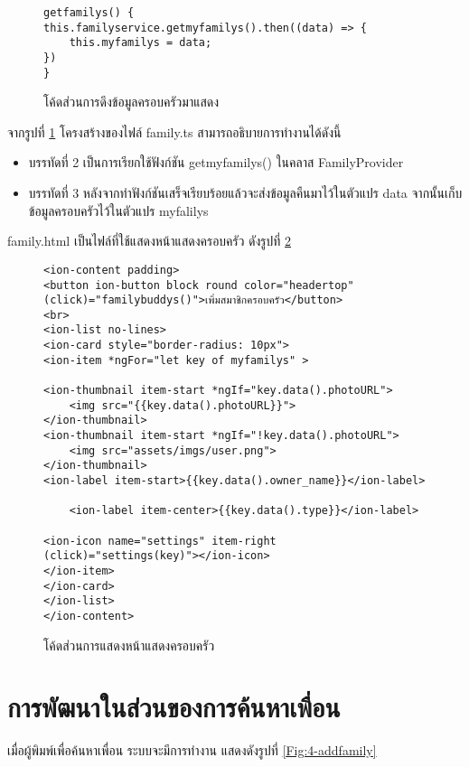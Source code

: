 \begin{figure}[H]
{\lstset{language=Pascal}
\begin{lstlisting}
getfamilys() {
this.familyservice.getmyfamilys().then((data) => {
	this.myfamilys = data;
})
}
\end{lstlisting}}
\caption{โค้ดส่วนการดึงข้อมูลครอบครัวมาแสดง}
\label{Fig:4-family}
\end{figure}

จากรูปที่ \ref{Fig:4-family} โครงสร้างของไฟล์ family.ts สามารถอธิบายการทำงานได้ดังนี้
\begin{itemize}[label={--}]
\item บรรทัดที่ 2 เป็นการเรียกใช้ฟังก์ชัน getmyfamilys() ในคลาส FamilyProvider
\item บรรทัดที่ 3 หลังจากทำฟังก์ชันเสร็จเรียบร้อยแล้วจะส่งข้อมูลคืนมาไว้ในตัวแปร data จากนั้นเก็บข้อมูลครอบครัวไว้ในตัวแปร myfalilys
\end{itemize}
\newpage

family.html เป็นไฟล์ที่ใช้แสดงหน้าแสดงครอบครัว ดังรูปที่ \ref{Fig:4-showfamily}
\begin{figure}[H]
{\lstset{language=Pascal}
\begin{lstlisting}
<ion-content padding>
<button ion-button block round color="headertop" (click)="familybuddys()">เพิ่มสมาชิกครอบครัว</button>
<br>
<ion-list no-lines>
<ion-card style="border-radius: 10px">
<ion-item *ngFor="let key of myfamilys" >

<ion-thumbnail item-start *ngIf="key.data().photoURL">
	<img src="{{key.data().photoURL}}">
</ion-thumbnail>
<ion-thumbnail item-start *ngIf="!key.data().photoURL">
	<img src="assets/imgs/user.png">
</ion-thumbnail>
<ion-label item-start>{{key.data().owner_name}}</ion-label>

	<ion-label item-center>{{key.data().type}}</ion-label>

<ion-icon name="settings" item-right (click)="settings(key)"></ion-icon>
</ion-item>
</ion-card>
</ion-list>
</ion-content>
\end{lstlisting}}
\caption{โค้ดส่วนการแสดงหน้าแสดงครอบครัว}
\label{Fig:4-showfamily}
\end{figure}
\newpage



\section{การพัฒนาในส่วนของการค้นหาเพื่อน}
เมื่อผู้พิมพ์เพื่อค้นหาเพื่อน ระบบจะมีการทำงาน แสดงดังรูปที่ \ref{Fig:4-addfamily}

